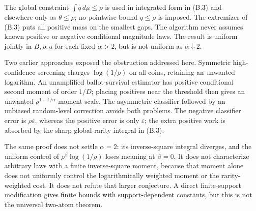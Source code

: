 The global constraint $\int q\,d\mu\le\rho$ is used in integrated form in
(B.3) and elsewhere only as $\theta\le\rho$; no pointwise bound
$q\le\rho$ is imposed. The extremizer of (B.3) puts all positive mass
on the smallest gaps. The algorithm never assumes known positive or negative
conditional magnitude laws. The result is uniform jointly in $B,\rho,a$ for
each fixed $\alpha>2$, but is not uniform as $\alpha\downarrow2$.

Two earlier approaches exposed the obstruction addressed here. Symmetric
high-confidence screening charges $\log(1/\rho)$ on all coins, retaining an
unwanted logarithm. An unamplified ballot-survival estimator has positive
conditional second moment of order $1/D$; placing positives near the threshold
then gives an unwanted $\rho^{1-1/\alpha}$ moment scale. The asymmetric
classifier followed by an unbiased random-level correction avoids both
problems. The negative classifier error is $\rho\varepsilon$, whereas the
positive error is only $\varepsilon$; the extra positive work is absorbed by
the sharp global-rarity integral in (B.3).

The same proof does not settle $\alpha=2$: its inverse-square integral diverges,
and the uniform control of $\rho^\beta\log(1/\rho)$ loses meaning at $\beta=0$.
It does not characterize arbitrary laws with a finite inverse-square moment,
because that moment alone does not uniformly control the logarithmically
weighted moment or the rarity-weighted cost. It does not refute that larger
conjecture. A direct finite-support modification gives finite bounds with
support-dependent constants, but this is not the universal two-atom theorem.
